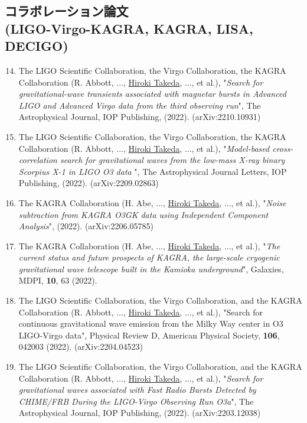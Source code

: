 \documentclass[uplatex, 11pt]{jsarticle}
\begin{document}
\subsection*{コラボレーション論文 \\(LIGO-Virgo-KAGRA, KAGRA, LISA, DECIGO)}
\begin{enumerate}
\setcounter{enumi}{13}
\item The LIGO Scientific Collaboration, the Virgo Collaboration, the KAGRA Collaboration (R. Abbott, ..., \uline{Hiroki Takeda}, ..., et al.), "\emph{Search for gravitational-wave transients associated with magnetar bursts in Advanced LIGO and Advanced Virgo data from the third observing run}", The Astrophysical Journal, IOP Publishing, (2022). (arXiv:2210.10931)\\

\item The LIGO Scientific Collaboration, the Virgo Collaboration, the KAGRA Collaboration (R. Abbott, ..., \uline{Hiroki Takeda}, ..., et al.), "\emph{Model-based cross-correlation search for gravitational waves from the low-mass X-ray binary Scorpius X-1 in LIGO O3 data }", The Astrophysical Journal Letters, IOP Publishing, (2022). (arXiv:2209.02863)\\

\item The KAGRA Collaboration (H. Abe, ..., \uline{Hiroki Takeda}, ..., et al.), "\emph{Noise subtraction from KAGRA O3GK data using Independent Component Analysis}", (2022). (arXiv:2206.05785)\\

\item The KAGRA Collaboration (H. Abe, ..., \uline{Hiroki Takeda}, ..., et al.), "\emph{The current status and future prospects of KAGRA, the large-scale cryogenic gravitational wave telescope built in the Kamioka underground}", Galaxies, MDPI, {\bf 10}, 63 (2022). \\

\item The LIGO Scientific Collaboration, the Virgo Collaboration, and the KAGRA Collaboration (R. Abbott, ..., \uline{Hiroki Takeda}, ..., et al.),
"Search for continuous gravitational wave emission from the Milky Way center in O3 LIGO-Virgo data", Physical Review D, American Physical Society, {\bf 106}, 042003 (2022).
(arXiv:2204.04523)\\

\item The LIGO Scientific Collaboration, the Virgo Collaboration, and the KAGRA Collaboration (R. Abbott, ..., \uline{Hiroki Takeda}, ..., et al.),
"\emph{Search for gravitational waves associated with Fast Radio Bursts Detected by CHIME/FRB During the LIGO-Virgo Observing Run O3a}",  The Astrophysical Journal, IOP Publishing,  (2022). (arXiv:2203.12038)\\


\end{enumerate}
\end{document}
